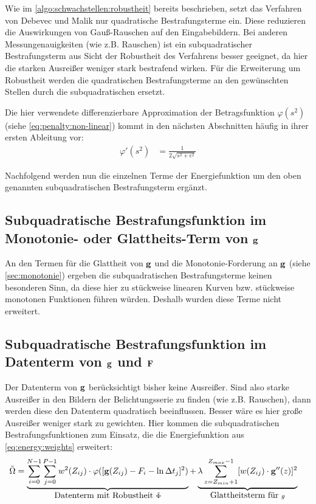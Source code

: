 Wie im \autoref{algo:schwachstellen:robustheit} bereits beschrieben, setzt das Verfahren von Debevec und Malik nur quadratische Bestrafungsterme ein. Diese reduzieren die Auswirkungen von Gauß-Rauschen auf den Eingabebildern. Bei anderen Messungenauigkeiten (wie z.B. Rauschen) ist ein subquadratischer Bestrafungsterm aus Sicht der Robustheit des Verfahrens besser geeignet, da hier die starken Ausreißer weniger stark bestrafend wirken. Für die Erweiterung um Robustheit werden die quadratischen Bestrafungsterme an den gewünschten Stellen durch die subquadratischen ersetzt. 

Die hier verwendete differenzierbare Approximation der Betragsfunktion $\varphi(s^2)$ (siehe \autoref{eq:penalty:non-linear}) kommt in den nächsten Abschnitten häufig in ihrer ersten Ableitung vor:
\begin{align*}
\varphi'(s^2) &= \frac{1}{2\sqrt{s^2+\epsilon^2}}
\end{align*}

Nachfolgend werden nun die einzelnen Terme der Energiefunktion um den oben genannten subquadratischen Bestrafungsterm ergänzt.
\subsection{Subquadratische Bestrafungsfunktion im Monotonie- oder Glattheits-Term von $\mathbf g$}
An den Termen für die Glattheit von $\mathbf g$ und die Monotonie-Forderung an $\mathbf g$ (siehe \autoref{sec:monotonie}) ergeben die subquadratischen Bestrafungsterme keinen besonderen Sinn, da diese hier zu stückweise linearen Kurven bzw. stückweise monotonen Funktionen führen würden. Deshalb wurden diese Terme nicht erweitert.


\subsection{Subquadratische Bestrafungsfunktion im Datenterm von $\mathbf g$ und $\mathbf F$}
\label{subsec:robust:e:daten}

Der Datenterm von $\mathbf g$ berücksichtigt bisher keine Ausreißer. Sind also starke Ausreißer in den Bildern der Belichtungsserie zu finden (wie z.B. Rauschen), dann werden diese den Datenterm quadratisch beeinflussen. Besser wäre es hier große Ausreißer weniger stark zu gewichten.
Hier kommen die subquadratischen Bestrafungsfunktionen zum Einsatz, die die Energiefunktion aus \autoref{eq:energy:weights} erweitert:
\begin{align}
\label{eq:energy:robust}
\tilde{\Omega} &= 
    \underbrace{\sum_{i=0}^{N-1} \sum_{j=0}^{P-1} w^2(Z_{ij})
    \cdot \varphi([\mathbf g(Z_{ij}) - F_i - \ln \Delta t_j]^2)}_{\mbox{Datenterm mit Robustheit }\tilde{\Phi}}
    + \underbrace{\lambda  \sum_{z=Z_{min}+1}^{Z_{max}-1} [w(Z_{ij}) \cdot \mathbf g''(z)]^2}_{\mbox{Glattheitsterm für }g}
\end{align}

